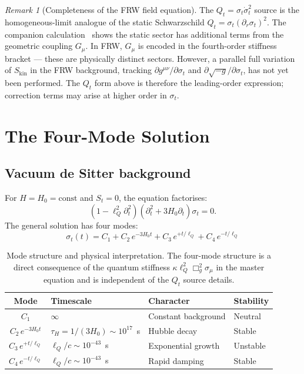 \documentclass[11pt,a4paper]{article}
\theoremstyle{plain}
\theoremstyle{definition}
\theoremstyle{remark}
\newtheorem{remark}{Remark}[section]
\newcommand{\lQ}{\ell_Q}
\newcommand{\dotv}{\dot\sigma_t}
\begin{document}
\begin{remark}[Completeness of the FRW field equation]
The $Q_t = \sigma_t\dotv^2$ source is the homogeneous-limit analogue of
the static Schwarzschild $Q_t = \sigma_t(\partial_r\sigma_t)^2$.  The
companion calculation~\cite{matshaba2026:kin_var} shows the static
sector has additional terms from the geometric coupling $G_\mu$.  In
FRW, $G_\mu$ is encoded in the fourth-order stiffness bracket --- these
are physically distinct sectors.  However, a parallel full variation of
$S_{\mathrm{kin}}$ in the FRW background, tracking $\partial
g^{\mu\nu}/\partial\sigma_t$ and $\partial\sqrt{-g}/\partial\sigma_t$,
has not yet been performed.  The $Q_t$ form above is therefore the
leading-order expression; correction terms may arise at higher order
in $\sigma_t$.
\end{remark}

\section{The Four-Mode Solution}
\label{sec:modes}

\subsection{Vacuum de Sitter background}

For $H = H_0 = \mathrm{const}$ and $S_t = 0$, the equation factorises:
\begin{equation}
  (1 - \lQ^2\partial_t^2)(\partial_t^2 + 3H_0\partial_t)\sigma_t = 0.
\end{equation}
The general solution has four modes:
\begin{equation}
  \boxed{\sigma_t(t) = C_1 + C_2\,e^{-3H_0 t}
                     + C_3\,e^{+t/\lQ} + C_4\,e^{-t/\lQ}}
  \label{eq:four_modes}
\end{equation}

\begin{table}[h]
  \centering
  \caption{Mode structure and physical interpretation.
  The four-mode structure is a direct consequence of the
  quantum stiffness $\kappa\lQ^2\Box_g^2\sigma_\mu$ in the master
  equation and is independent of the $Q_t$ source details.}
  \label{tab:modes}
  \begin{tabular}{@{}clll@{}}
    \toprule
    Mode & Timescale & Character & Stability \\
    \midrule
    $C_1$ & $\infty$ & Constant background & Neutral \\
    $C_2\,e^{-3H_0t}$ & $\tau_H = 1/(3H_0) \sim 10^{17}$~s & Hubble decay & Stable \\
    $C_3\,e^{+t/\lQ}$ & $\lQ/c \sim 10^{-43}$~s & Exponential growth & Unstable \\
    $C_4\,e^{-t/\lQ}$ & $\lQ/c \sim 10^{-43}$~s & Rapid damping & Stable \\
    \bottomrule
  \end{tabular}
\end{table}
\end{document}
